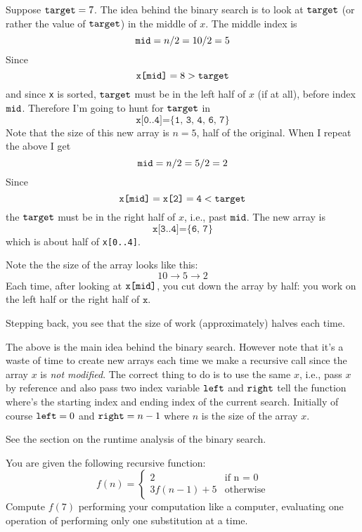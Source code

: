 Suppose $\texttt{target} = 7$.
The idea behind the binary search is to look at 
$\texttt{target}$ (or rather the value of $\texttt{target}$) in the 
middle of $x$.
The middle index is
\[
\texttt{mid} = n/2 = 10/2 = 5
\]
Since 
\[
\texttt{x[\texttt{mid}]} = 8 > \texttt{target}
\]
and since \verb!x! is sorted, $\texttt{target}$ must be in the left half
of $x$ (if at all), before index $\texttt{mid}$.
Therefore I'm going to hunt for $\texttt{target}$ in 
\[
\texttt{x[0..4]} = \texttt{\{1, 3, 4, 6, 7\}}
\]
Note that the size of this new array is $n = 5$, half of the original.
When I repeat the above I get
\[
\texttt{mid} = n/2 = 5/2 = 2
\]
Since 
\[
\texttt{x[\texttt{mid}]} = \texttt{x[2]} = \texttt{4} < \texttt{target}
\]
the $\texttt{target}$ must be in the right half of $x$, i.e., 
past $\texttt{mid}$.
The new array is
\[
\texttt{x[3..4]} = \texttt{\{6, 7\}}
\]
which is about half of \verb!x[0..4]!.

Note the the size of the array looks like this:
\[
10 \rightarrow 5 \rightarrow 2
\]
Each time, after looking at $\texttt{x[\texttt{mid}]}$,
you cut down the array by half: you work on the left half or the right half
of $\texttt{x}$.

Stepping back, you see that the size of work (approximately) halves each time.

The above is the main idea behind the binary search.
However note that it's a waste of time to create new arrays each time we
make a recursive call since the array $x$ is \textit{not modified}.
The correct thing to do is to use the same $x$, i.e.,
pass $x$ by reference and 
also pass two index variable $\texttt{left}$ and $\texttt{right}$
tell the function where's the starting index and ending index
of the current search.
Initially of course $\texttt{left} = 0$ and $\texttt{right} = n - 1$
where $n$ is the size of the array $x$.

See the section on the runtime analysis of the binary search.



\newpage
\begin{ex}
You are given the following recursive function:
\[
f(n) = 
\begin{cases}
2           & \text{if n = 0} \\
3f(n-1) + 5 &\text{otherwise}
\end{cases}
\]
Compute $f(7)$ performing your computation like a computer,
evaluating one operation of performing only one substitution at a time.
\end{ex}




